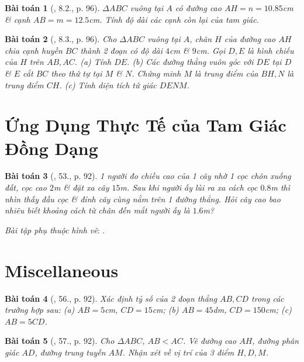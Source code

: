 \documentclass{article}
\newtheorem{baitoan}{Bài toán}
\begin{document}
\begin{baitoan}[\cite{SBT_Toan_8_tap_2}, 8.2., p. 96]
	$\Delta ABC$ vuông tại $A$ có đường cao $AH = n = 10.85$\emph{cm} \& cạnh $AB = m = 12.5$\emph{cm}. Tính độ dài các cạnh còn lại của tam giác.
\end{baitoan}

\begin{baitoan}[\cite{SBT_Toan_8_tap_2}, 8.3., p. 96]
	Cho $\Delta ABC$ vuông tại $A$, chân $H$ của đường cao $AH$ chia cạnh huyền $BC$ thành 2 đoạn có độ dài $4$\emph{cm} \& $9$\emph{cm}. Gọi $D,E$ là hình chiếu của $H$ trên $AB,AC$. (a) Tính $DE$. (b) Các đường thẳng vuôn góc với $DE$ tại $D$ \& $E$ cắt $BC$ theo thứ tự tại $M$ \& $N$. Chứng minh $M$ là trung điểm của $BH,N$ là trung điểm $CH$. (c) Tính diện tích tứ giác $DENM$.
\end{baitoan}


\section{Ứng Dụng Thực Tế của Tam Giác Đồng Dạng}

\begin{baitoan}[\cite{SGK_Toan_8_tap_2}, 53., p. 92]
	1  người đo chiều cao của 1 cây nhờ 1 cọc chôn xuống đất, cọc cao $2$\emph{m} \& đặt xa cây $15$\emph{m}. Sau khi người ấy lùi ra xa cách cọc $0.8$\emph{m} thì nhìn thấy đầu cọc \& đỉnh cây cùng nằm trên 1 đường thẳng. Hỏi cây cao bao nhiêu biết khoảng cách từ chân đến mắt người ấy là $1.6$\emph{m}?
\end{baitoan}
\noindent\textit{Bài tập phụ thuộc hình vẽ}: \cite[54.--55., p. 87]{SGK_Toan_8_tap_2}.


\section{Miscellaneous}

\begin{baitoan}[\cite{SGK_Toan_8_tap_2}, 56., p. 92]
	Xác định tỷ số của 2 đoạn thẳng $AB,CD$ trong các trường hợp sau: (a) $AB = 5$\emph{cm}, $CD = 15$\emph{cm}; (b) $AB = 45$\emph{dm}, $CD = 150$\emph{cm}; (c) $AB = 5CD$.
\end{baitoan}

\begin{baitoan}[\cite{SGK_Toan_8_tap_2}, 57., p. 92]
	Cho $\Delta ABC$, $AB < AC$. Vẽ đường cao $AH$, đường phân giác $AD$, đường trung tuyến $AM$. Nhận xét về vị trí của 3 điểm $H,D,M$.
\end{baitoan}
\end{document}
